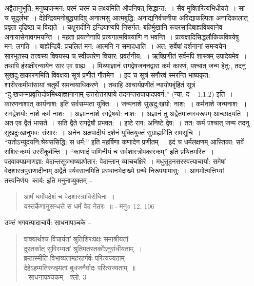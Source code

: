 {अद्वैतानुभूति: मनुष्यजन्मन: परमं चरमं च लक्ष्यमिति औपनिषत् सिद्धान्त:~। सैव मुक्तिरित्यभिधीयते~। सा च सुदुर्लभा~। देहेन्द्रियमनोबुद्ध्यादिषु अनात्मसु आत्मबुद्धि: अनाद्यनिर्वचनीया अविद्याकल्पिता अनादिकालात् प्रवृता दृढिष्ठा च विद्यते~। चक्षुरादीनि इन्द्रियाण्यपि निसर्गत: बहिर्मुखानि रूपरसादिबाह्यविषयानेव अनायासेनावगमयन्ति~। महता प्रयत्नेनापि प्रत्यगात्मविषयाणि न भवन्ति~। प्रत्यक्षादिसिद्धलौकिकविषयेषु मन: लगति~। बाह्येन्द्रियै: प्रचलितं मन: आत्मनि न समादधाति~। अत: सर्वेषां दर्शनानां समन्वयेन सारभूतस्य तत्त्वस्य विषयस्य च स्वीकारेण विचार: प्रवर्तनीय:~। ऋषिप्रणीतं सर्वमपि शास्त्रम् उपादेयमेव~। तथापि हंसक्षीरन्यायेन सार एव ग्राह्य:~। मिथ्याज्ञानं रागद्वेषजननद्वारा कर्म कारणं, पश्चात् जन्म हेतु:, तदनु सुखदु:खकारणमिति विवक्षया सूत्रं प्रणीतं गौतमेन~। इदं च सूत्रं सगौरवं स्मरन्ति भाष्यकृत: शारीरकमीमांसायां चतुर्थे समन्वयाधिकरणे~। तथाहि आचार्यप्रणीतं न्यायोपबृंहितं सूत्रं “दु:खजन्मप्रवृत्तिदोषमिथ्याज्ञानानाम् उत्तरोत्तरापाये तदनन्तरापायादपवर्ग:” (न्या. द – 1.1.2) इति~। कारणनाशात् कार्यनाश: इति सर्वसम्मता युक्ति:~। जन्मनाशे सुखदु:खयो: नाश:~। कर्मनाशे जन्मनाश:~। रागद्वेशयो: नाशे कर्म नाश:~। अज्ञाननाशे रगद्वेषयो: नाश:~। अज्ञानं तु अद्वैतमात्मस्वरूपम् आच्छादयति~। अत एव द्वैतं भासते~। सति द्वैते रागद्वेषौ प्रभवत:~। इष्टे राग: अनिष्टे द्वेष:~। तत: कर्म पश्चात् जन्म तदनु सुखदु:खानुभव: संसार:~। अनेन अक्षपादीयं दर्शनं युक्तियुक्तं सुग्राह्यमिति समसूचि~। “यतोऽभ्युदयनि:श्रेयससिद्धि: स धर्म:” इति महर्षिणा कणादेन प्रणीतम्~। इदं च धर्मलक्षणम् आस्तिका: सर्वे सशिर:कम्पं उररीकुर्वन्ति~। “काणादं पाणिनीयं च सर्वशास्त्रोपकारकम्” इति प्रथितमस्ति~। पदवाक्यप्रमाणज्ञा: वेदान्तसूत्रभाष्यप्रणेतार: वेदान्तान् व्याचचक्षिरे~। मधुसूदनसरस्वत्याचार्या: समेषां वेदशास्त्रपुराणादीनाम् अद्वैते पर्यवसानमिति प्रस्थानभेदाख्ये ग्रन्थे निरूपयामासु:~। आगमोत्पत्तिभ्यां तत्त्वनिर्णय: कार्य: इति मनुनाप्युक्तम् –
\begin{verse}
आर्षं धर्मोपदेशं च वेदशास्त्राविरोधिना~। \\
यस्तर्केणानुसन्धत्ते स धर्मं वेद नेतरः~॥ - मनु० 12. 106
\end{verse}
उक्तं भगवत्पादाचार्यै: साधनापञ्चके –
\begin{verse}
वाक्यार्थश्च विचार्यतां श्रुतिशिरःपक्षः समाश्रीयतां\\
दुस्तर्कात् सुविरम्यतां श्रुतिमतस्तर्कोऽनुसंधीयताम्~। \\  
ब्रम्हास्मीति विभाव्यतामहरहर्गर्वः परित्यज्यताम्\\  
देहेऽहम्मतिरुज्झ्यतां बुधजनैर्वादः परित्यज्यताम्~॥\\
\hspace{5cm} - साधनापञ्चकम् - श्लो. 3
\end{verse}
}
